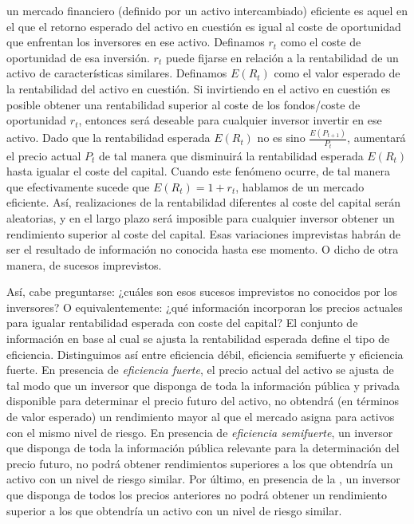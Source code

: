 \documentclass{nuevotema}
\begin{document}
 un mercado financiero (definido por un activo intercambiado) eficiente es aquel en el que el retorno esperado del activo en cuestión es igual al coste de oportunidad que enfrentan los inversores en ese activo. Definamos $r_t$ como el coste de oportunidad de esa inversión. $r_t$ puede fijarse en relación a la rentabilidad de un activo de características similares. Definamos $E(R_t)$ como el valor esperado de la rentabilidad del activo en cuestión. Si invirtiendo en el activo en cuestión es posible obtener una rentabilidad superior al coste de los fondos/coste de oportunidad $r_t$, entonces será deseable para cualquier inversor invertir en ese activo. Dado que la rentabilidad esperada $E(R_t)$ no es sino $\frac{E(P_{t+1})}{P_t}$, aumentará el precio actual $P_t$ de tal manera que disminuirá la rentabilidad esperada $E(R_t)$ hasta igualar el coste del capital. Cuando este fenómeno ocurre, de tal manera que efectivamente sucede que $E(R_t) = 1 + r_t$, hablamos de un mercado eficiente. Así, realizaciones de la rentabilidad diferentes al coste del capital serán aleatorias, y en el largo plazo será imposible para cualquier inversor obtener un rendimiento superior al coste del capital. Esas variaciones imprevistas habrán de ser el resultado de información no conocida hasta ese momento. O dicho de otra manera, de sucesos imprevistos.

Así, cabe preguntarse: ¿cuáles son esos sucesos imprevistos no conocidos por los inversores? O equivalentemente: ¿qué información incorporan los precios actuales para igualar rentabilidad esperada con coste del capital? El conjunto de información en base al cual se ajusta la rentabilidad esperada define el tipo de eficiencia. Distinguimos así entre eficiencia débil, eficiencia semifuerte y eficiencia fuerte. En presencia de \textit{eficiencia fuerte}, el precio actual del activo se ajusta de tal modo que un inversor que disponga de toda la información pública y privada disponible para determinar el precio futuro del activo, no obtendrá (en términos de valor esperado) un rendimiento mayor al que el mercado asigna para activos con el mismo nivel de riesgo. En presencia de \textit{eficiencia semifuerte}, un inversor que disponga de toda la información pública relevante para la determinación del precio futuro, no podrá obtener rendimientos superiores a los que obtendría un activo con un nivel de riesgo similar. Por último, en presencia de la , un inversor que disponga de todos los precios anteriores no podrá obtener un rendimiento superior a los que obtendría un activo con un nivel de riesgo similar.
\end{document}
